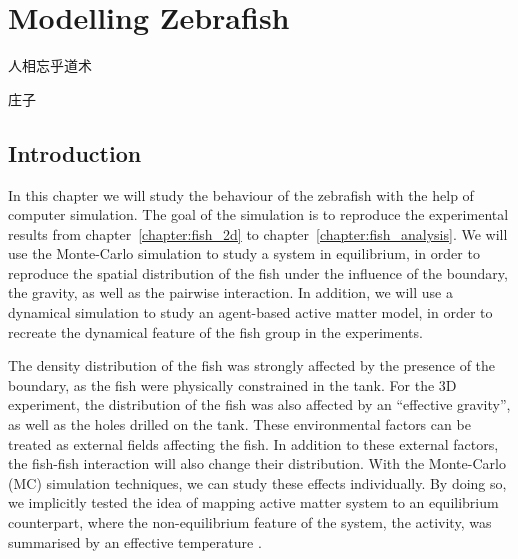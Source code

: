 \documentclass[11pt,twoside]{report}
\begin{document}
\chapter{Modelling Zebrafish}
\label{chapter:fish_model}


\epigraph{人相忘乎道术}{庄子}


\section{Introduction}

In this chapter we will study the behaviour of the zebrafish with the help of computer simulation. The goal of the simulation is to reproduce the experimental results from chapter~\ref{chapter:fish_2d} to chapter~\ref{chapter:fish_analysis}.
We will use the Monte-Carlo simulation to study a system in equilibrium, in order to reproduce the spatial distribution of the fish under the influence of the boundary, the gravity, as well as the pairwise interaction.
In addition, we will use a dynamical simulation to study an agent-based active matter model, in order to recreate the dynamical feature of the fish group in the experiments.

The density distribution of the fish was strongly affected by the presence of the boundary, as the fish were physically constrained in the tank.
For the 3D experiment, the distribution of the fish was also affected by an ``effective gravity'', as well as the holes drilled on the tank. These environmental factors can be treated as external fields affecting the fish. In addition to these external factors, the fish-fish interaction will also change their distribution.
With the Monte-Carlo (\gls{MC}) simulation techniques, we can study these effects individually. By doing so, we implicitly tested the idea of mapping active matter system to an equilibrium counterpart, where the non-equilibrium feature of the system, the activity, was summarised by an effective temperature \cite{palacci2010, klongvessa2019}.
\end{document}
